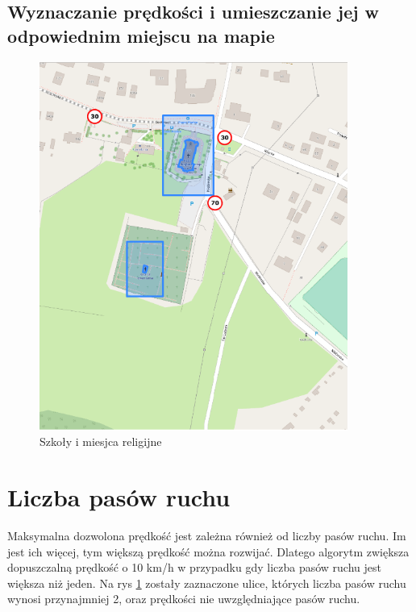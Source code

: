 \newpage
\subsection{Wyznaczanie prędkości i umieszczanie jej w odpowiednim miejscu na mapie}

\begin{figure}[h]
\caption{Szkoły i miesjca religijne}
\label{sec:shopsSpeed}
\centering
\includegraphics[width=0.9\textwidth]{shopsSpeed}
\end{figure}
\newpage
\section{Liczba pasów ruchu}
\label{sec:laneNumber}

Maksymalna dozwolona prędkość jest zależna również od liczby pasów ruchu. Im jest ich więcej, tym większą prędkość można rozwijać. Dlatego algorytm zwiększa dopuszczalną prędkość o 10 km/h w przypadku gdy liczba pasów ruchu jest większa niż jeden. Na rys \ref{sec:laneNumber} zostały zaznaczone ulice, których liczba pasów ruchu wynosi przynajmniej 2, oraz prędkości nie uwzględniające pasów ruchu. 

